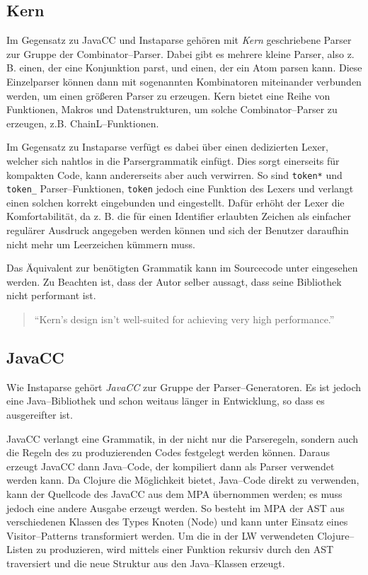 \documentclass[ngerman,a4paper,abstracton,open=right,twoside=false,toc=listofnumbered,bibtotocnumbered]{scrreprt}
\begin{document}
\subsection{Kern}

Im Gegensatz zu JavaCC und Instaparse gehören mit \emph{Kern} geschriebene Parser zur Gruppe der Combinator--Parser. Dabei gibt es mehrere \glqq{}kleine\grqq{} Parser, also z. B. einen, der eine Konjunktion parst, und einen, der ein Atom parsen kann. Diese Einzelparser können dann mit sogenannten Kombinatoren miteinander verbunden werden, um einen größeren Parser zu erzeugen. Kern bietet eine Reihe von Funktionen, Makros und Datenstrukturen, um solche Combinator--Parser zu erzeugen, z.B. ChainL--Funktionen.

Im Gegensatz zu Instaparse verfügt es dabei über einen dedizierten Lexer, welcher sich nahtlos in die Parsergrammatik einfügt. Dies sorgt einerseits für kompakten Code, kann andererseits aber auch verwirren. So sind \lstinline|token*| und \lstinline|token_| Parser--Funktionen, \lstinline|token| jedoch eine Funktion des Lexers und verlangt einen solchen korrekt eingebunden und eingestellt. Dafür erhöht der Lexer die Komfortabilität, da z. B. die für einen Identifier erlaubten Zeichen als einfacher regulärer Ausdruck angegeben werden können und sich der Benutzer daraufhin nicht mehr um Leerzeichen kümmern muss.

Das Äquivalent zur benötigten Grammatik kann im Sourcecode unter \cite{lw} eingesehen werden. Zu Beachten ist, dass der Autor selber aussagt, dass seine Bibliothek nicht performant ist. 

\begin{quote}
	``Kern's design isn't well-suited for achieving very high performance.'' \cite{kern}
\end{quote}

\subsection{JavaCC}\label{JavaCC}

Wie Instaparse gehört \emph{JavaCC} zur Gruppe der Parser--Generatoren. Es ist jedoch eine Java--Bibliothek und schon weitaus länger in Entwicklung, so dass es ausgereifter ist. \cite{javacc}

JavaCC verlangt eine Grammatik, in der nicht nur die Parseregeln, sondern auch die Regeln des zu produzierenden Codes festgelegt werden können. Daraus erzeugt JavaCC dann Java--Code, der kompiliert dann als Parser verwendet werden kann. Da Clojure die Möglichkeit bietet, Java--Code direkt zu verwenden, kann der Quellcode des JavaCC aus dem MPA übernommen werden; es muss jedoch eine andere Ausgabe erzeugt werden. So besteht im MPA der AST aus verschiedenen Klassen des Types \glqq{}Knoten\grqq{} (Node) und kann unter Einsatz eines Visitor--Patterns transformiert werden. Um die in der LW verwendeten Clojure--Listen zu produzieren, wird mittels einer Funktion rekursiv durch den AST traversiert und die neue Struktur aus den Java--Klassen erzeugt.
\end{document}
